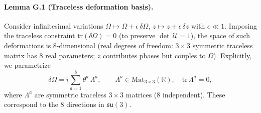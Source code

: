 \paragraph{Lemma G.1 (Traceless deformation basis).}
Consider infinitesimal variations $\Omega \mapsto \Omega + \epsilon\,\delta\Omega$, $z \mapsto z + \epsilon\,\delta z$ with $\epsilon \ll 1$. Imposing the traceless constraint $\mathrm{tr}(\delta\Omega)=0$ (to preserve $\det\,\mathcal{U}=1$), the space of such deformations is 8-dimensional (real degrees of freedom: $3\times 3$ symmetric traceless matrix has 8 real parameters; $z$ contributes phases but couples to $\Omega$). Explicitly, we parametrize
\begin{equation}
\delta\Omega = i\sum_{a=1}^8 \theta^a\,\Lambda^a, 
\qquad 
\Lambda^a \in \mathrm{Mat}_{3\times 3}(\mathbb{R}), \quad \mathrm{tr}\,\Lambda^a=0,
\end{equation}
where $\Lambda^a$ are symmetric traceless $3\times 3$ matrices (8 independent). These correspond to the 8 directions in $\mathfrak{su}(3)$.

